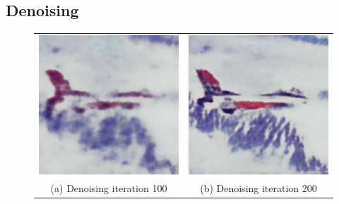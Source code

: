 \documentclass[A4]{article}
\begin{document}
\subsection{Denoising}
\begin{figure}[H]
\begin{tabular}{cc}
\includegraphics[width=80mm]{denoising-iteration-100.png} & \includegraphics[width=80mm]{denoising-iteration-200.png} \\
(a) Denoising iteration 100 & (b) Denoising iteration 200 \\[6pt]

\end{tabular}
\end{figure}
\end{document}
